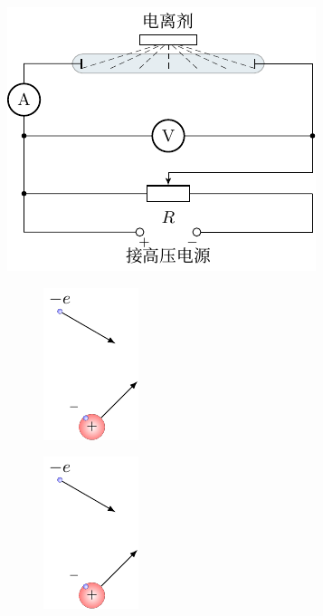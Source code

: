 \begin{figure}[htbp]
    \centering
    \begin{minipage}[b]{0.48\textwidth}
        \centering
        \includegraphics{fig/B/8-5.pdf}
        \caption{}\label{fig_B_8-5}
    \end{minipage}
    \begin{minipage}[b]{0.48\textwidth}
        \centering
        \begin{subfigure}{0.45\linewidth}
            \centering
            \includegraphics{fig/B/8-6a.pdf}
            \caption{}\label{fig_B_8-6a}
        \end{subfigure}
        \hfil
        \begin{subfigure}{0.45\linewidth}
            \centering
            \includegraphics{fig/B/8-6a.pdf}
            \caption{}\label{fig_B_8-6a}
        \end{subfigure}
        \caption{}\label{fig_B_8-6}
    \end{minipage}
\end{figure}

